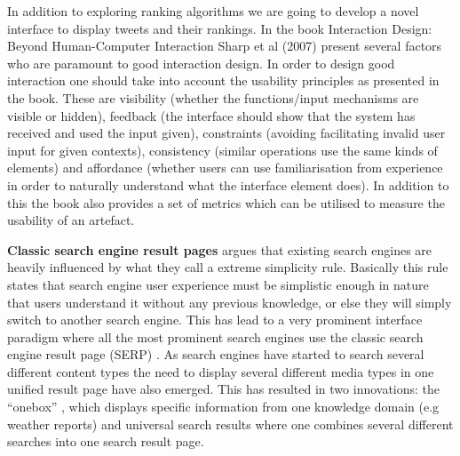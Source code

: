 In addition to exploring ranking algorithms we are going to develop a novel interface to display tweets and their rankings. In the book Interaction Design: Beyond Human-Computer Interaction Sharp et al (2007) present several factors who are paramount to good interaction design. In order to design good interaction one should take into account the usability principles as presented in the book. These are visibility (whether the functions/input mechanisms are visible or hidden), feedback (the interface should show that the system has received and used the input given), constraints (avoiding facilitating invalid user input for given contexts), consistency (similar operations use the same kinds of elements) and affordance (whether users can use familiarisation from experience in order to naturally understand what the interface element does). In addition to this the book also provides a set of metrics which can be utilised to measure the usability of an artefact.\newline

{\bf \noindent Classic search engine result pages}\newline
\citet[p.480]{Baeza-Yates2011} argues that existing search engines are heavily influenced by what they call a extreme simplicity rule. Basically this rule states that search engine user experience must be simplistic enough in nature that users understand it without any previous knowledge, or else they will simply switch to another search engine. This has lead to a very prominent interface paradigm where all the most prominent search engines use the classic search engine result page (SERP) \citep{Baeza-Yates2011}. 
As search engines have started to search several different content types the need to display several different media types in one unified result page have also emerged. This has resulted in two innovations: the “onebox” \citep{Baeza-Yates2011}, which displays specific information from one knowledge domain (e.g weather reports) and universal search results where one combines several different searches into one search result page.


